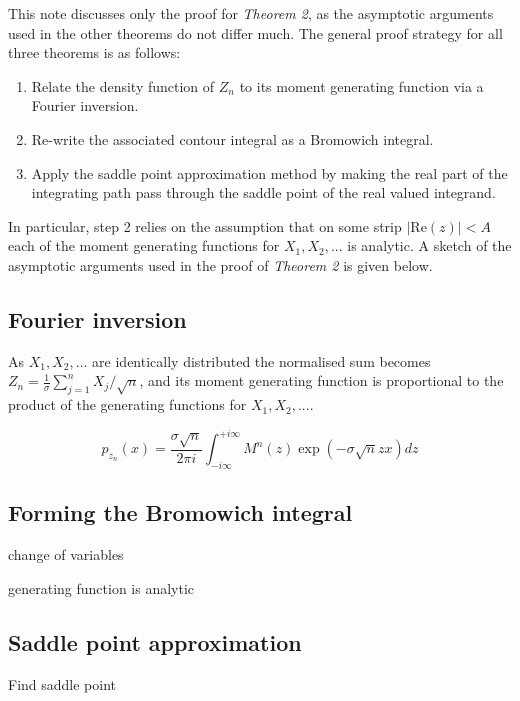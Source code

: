 \documentclass{article}
\begin{document}
This note discusses only the proof for \textit{Theorem 2}, as the asymptotic arguments used in the other theorems do not differ much. The general proof strategy for all three theorems is as follows:

\begin{enumerate}
    \item Relate the density function of $Z_n$ to its moment generating function via a Fourier inversion. 
    \item Re-write the associated contour integral as a Bromowich integral.  
    \item Apply the saddle point approximation method by making the real part of the integrating path pass through the saddle point of the real valued integrand.
\end{enumerate}

In particular, step 2 relies on the assumption that on some strip $|\text{Re}(z)| < A$ each of the moment generating functions for $X_1, X_2, ...$ is analytic. A sketch of the asymptotic arguments used in the proof of \textit{Theorem 2} is given below. 

\subsection*{Fourier inversion}

As $X_1, X_2, ...$ are identically distributed the normalised sum becomes $Z_n = \frac{1}{\sigma} \sum_{j=1}^{n}X_j / \sqrt{n}$, and its moment generating function is proportional to the product of the generating functions for $X_1, X_2, ...$. 

\begin{equation*}
    p_{z_n}(x) = \frac{\sigma \sqrt{n}}{2\pi i}\int_{-i\infty}^{+i\infty} M^n(z) \exp \left ( -\sigma \sqrt{n} z x \right ) dz
\end{equation*}

\subsection*{Forming the Bromowich integral}

change of variables 

generating function is analytic

\subsection*{Saddle point approximation}

Find saddle point 
\end{document}
